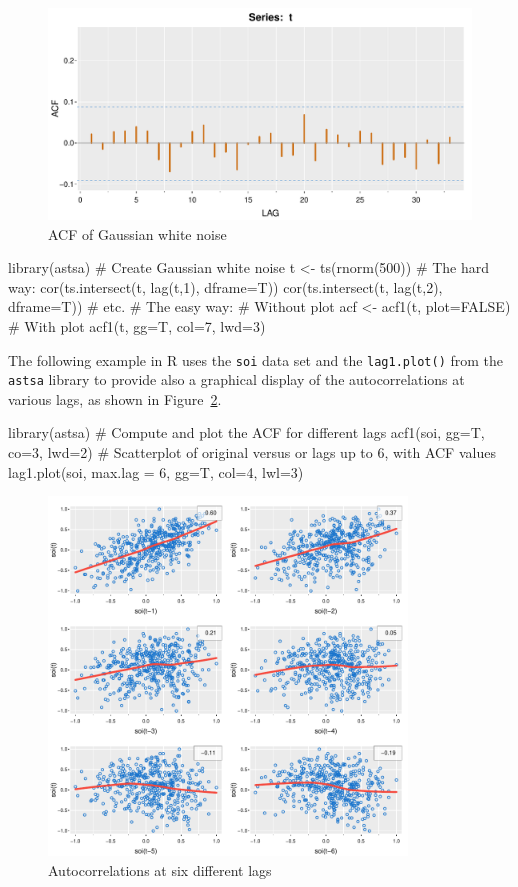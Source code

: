 \begin{figure}
\centering
\includegraphics[width=.75\textwidth]{figure7a.pdf}
\caption{ACF of Gaussian white noise}
\label{fig:figure7a}
\end{figure}

\begin{samepage}
\begin{Rcode}
library(astsa)
# Create Gaussian white noise
t <- ts(rnorm(500))
# The hard way:
cor(ts.intersect(t, lag(t,1), dframe=T))
cor(ts.intersect(t, lag(t,2), dframe=T))
# etc.
# The easy way:
# Without plot
acf <- acf1(t, plot=FALSE)
# With plot
acf1(t, gg=T, col=7, lwd=3)
\end{Rcode}
\end{samepage}

The following example in R uses the \texttt{soi} data set and the \texttt{lag1.plot()} from the \texttt{astsa} library to provide also a graphical display of the autocorrelations at various lags, as shown in Figure~\ref{fig:figure8a}.

\begin{samepage}
\begin{Rcode}
library(astsa)
# Compute and plot the ACF for different lags
acf1(soi, gg=T, co=3, lwd=2)
# Scatterplot of original versus or lags up to 6, with ACF values
lag1.plot(soi, max.lag = 6, gg=T, col=4, lwl=3)
\end{Rcode}
\end{samepage}

\begin{figure}
\centering
\includegraphics[height=3.75in]{figure8a.pdf}
\caption{Autocorrelations at six different lags}
\label{fig:figure8a}
\end{figure}

